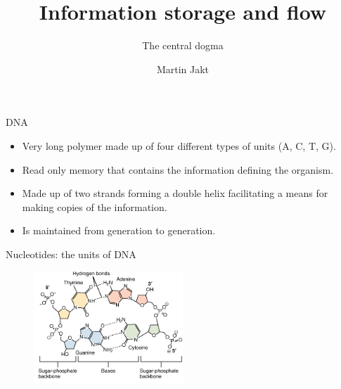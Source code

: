 \documentclass[pdf]{beamer}
\title{Information storage and flow}
\subtitle{The central dogma}
\author{Martin Jakt}
\begin{document}
\begin{frame}
  \titlepage
\end{frame}

\begin{frame}{DNA}
  \begin{itemize}
    \item Very long polymer made up of four different types
          of units (A, C, T, G).
    \item Read only memory that contains the information defining
          the organism.
    \item Made up of two strands forming a double helix facilitating
      a means for making copies of the information.
    \item Is maintained from generation to generation.
  \end{itemize}
\end{frame}

\begin{frame}{Nucleotides: the units of DNA}
  \begin{figure}[h]
    \includegraphics[width=0.5\textwidth]{images/0322_DNA_Nucleotides_crop}
  \end{figure}
  \footnotemark
\end{frame}
\end{document}
